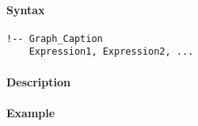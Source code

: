 


	\paragraph{Syntax}\label{syntax}

\begin{verbatim}
!-- Graph_Caption
    Expression1, Expression2, ...
\end{verbatim}

\paragraph{Description}\label{description}

\paragraph{Example}\label{example}


